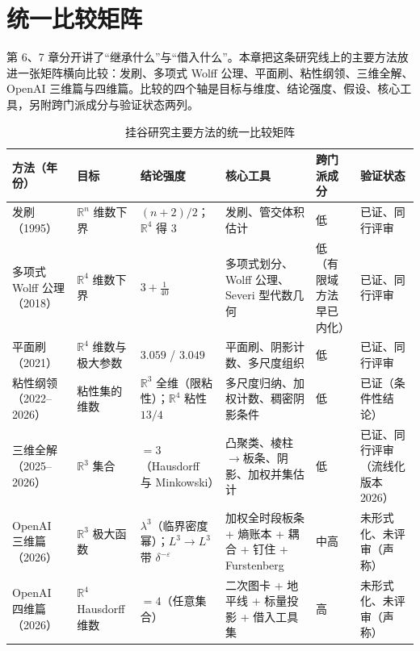 \section{统一比较矩阵}

第 6、7 章分开讲了“继承什么”与“借入什么”。本章把这条研究线上的主要方法放进一张矩阵横向比较：发刷、多项式 Wolff 公理、平面刷、粘性纲领、三维全解、OpenAI 三维篇与四维篇。比较的四个轴是目标与维度、结论强度、假设、核心工具，另附跨门派成分与验证状态两列。

\begin{table}[t]
\centering
\caption{挂谷研究主要方法的统一比较矩阵}
\label{tab:matrix}
\scriptsize
\begin{tabularx}{\textwidth}{@{}L{2.0cm}L{2.3cm}L{2.5cm}XL{1.5cm}L{1.7cm}@{}}
\toprule
{}\textbf{方法（年份）} & \textbf{目标} & \textbf{结论强度} & \textbf{核心工具} & \textbf{跨门派成分} & \textbf{验证状态} \\
\midrule
发刷（1995） & $\mathbb{R}^n$ 维数下界 & $(n+2)/2$；$\mathbb{R}^4$ 得 $3$ & 发刷、管交体积估计 & 低 & 已证、同行评审 \\
多项式 Wolff 公理（2018） & $\mathbb{R}^4$ 维数下界 & $3+\frac{1}{40}$ & 多项式划分、Wolff 公理、Severi 型代数几何 & 低（有限域方法早已内化） & 已证、同行评审 \\
平面刷（2021） & $\mathbb{R}^4$ 维数与极大参数 & $3.059$ / $3.049$ & 平面刷、阴影计数、多尺度组织 & 低 & 已证、同行评审 \\
粘性纲领（2022--2026） & 粘性集的维数 & $\mathbb{R}^3$ 全维（限粘性）；$\mathbb{R}^4$ 粘性 $13/4$ & 多尺度归纳、加权计数、稠密阴影条件 & 低 & 已证（条件性结论） \\
三维全解（2025--2026） & $\mathbb{R}^3$ 集合 & $=3$（Hausdorff 与 Minkowski） & 凸聚类、棱柱$\to$板条、阴影、加权并集估计 & 低 & 已证、同行评审（流线化版本 2026） \\
OpenAI 三维篇（2026） & $\mathbb{R}^3$ 极大函数 & $\lambda^{3}$（临界密度幂）；$L^3\to L^3$ 带 $\delta^{-\varepsilon}$ & 加权全时段板条 + 熵账本 + 耦合 + 钉住 + Furstenberg & 中高 & 未形式化、未评审（声称） \\
OpenAI 四维篇（2026） & $\mathbb{R}^4$ Hausdorff 维数 & $=4$（任意集合） & 二次图卡 + 地平线 + 标量投影 + 借入工具集 & 高 & 未形式化、未评审（声称） \\
\bottomrule
\end{tabularx}
\end{table}

